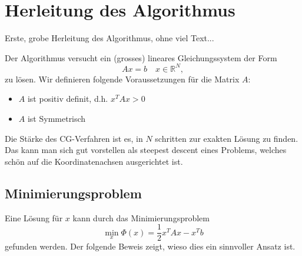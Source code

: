 \section{Herleitung des Algorithmus}
\label{cg:section:herleitung}


Erste, grobe Herleitung des Algorithmus, ohne viel Text...

Der Algorithmus versucht ein (grosses) lineares Gleichungssystem der Form
\begin{equation}
	Ax = b \quad x \in \mathbb{R}^N,
\end{equation}
zu lösen.
Wir definieren folgende Voraussetzungen für die Matrix $A$:
\begin{itemize}
	\item $A$ ist positiv definit, d.h. $x^T A x > 0$
	\item $A$ ist Symmetrisch
\end{itemize}

Die Stärke des CG-Verfahren ist es, in $N$ schritten zur exakten Lösung zu finden.
Das kann man sich gut vorstellen als steepest descent eines Problems, welches schön auf die Koordinatenachsen ausgerichtet ist. %

\subsection{Minimierungsproblem \label{cg:subsection:Minimierungsproblem}}

Eine Lösung für $x$ kann durch das Minimierungsproblem
\begin{equation}
	\min_{x} \Phi(x) = \frac{1}{2} x^T A x - x^T b
\end{equation}
gefunden werden.
Der folgende Beweis zeigt, wieso dies ein sinnvoller Ansatz ist.


